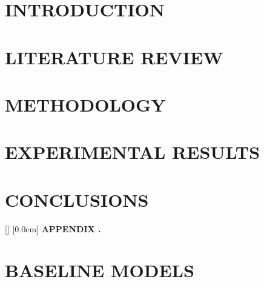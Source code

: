 \documentclass[a4paper,13pt,3p,twoside]{report}
\theoremstyle{definition}
\begin{document}
\chapter{INTRODUCTION}\label{chap:intro}


\newpage
\chapter{LITERATURE REVIEW}\label{chap:litreview}


\newpage
\chapter{METHODOLOGY}\label{chap:method}


\newpage
\chapter{EXPERIMENTAL RESULTS}\label{chap:results}


\newpage
\chapter{CONCLUSIONS}\label{chap:conclusions}


\newpage
\renewcommand\bibname{REFERENCE}
\printbibliography
{}

\newpage
\appendixpage        %
\appendix
\addappheadtotoc     %
\renewcommand{\chaptername}{APPENDIX}
[]
    [0.0cm]
    {\bfseries\vspace{0.3cm}}
    {{\bfseries APPENDIX \thecontentslabel.\ }}
    {}
    {\contentspage}
\chapter{BASELINE MODELS}\label{chap:baseline}

\end{document}
